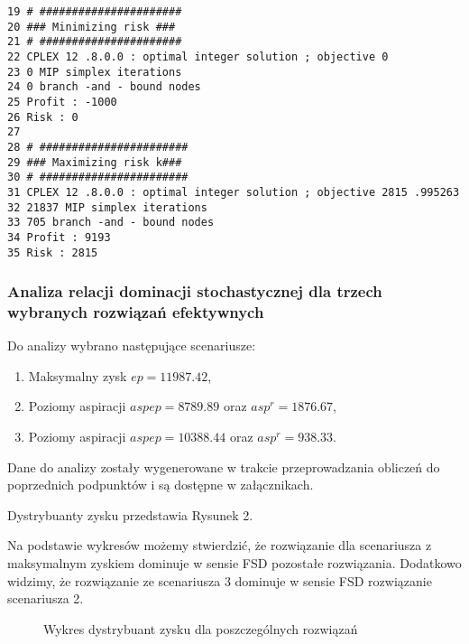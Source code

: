 \documentclass[12pt]{article}
\begin{document}
\begin{verbatim}
19 # ######################
20 ### Minimizing risk ###
21 # ######################
22 CPLEX 12 .8.0.0 : optimal integer solution ; objective 0
23 0 MIP simplex iterations
24 0 branch -and - bound nodes
25 Profit : -1000
26 Risk : 0
27
28 # #######################
29 ### Maximizing risk k###
30 # #######################
31 CPLEX 12 .8.0.0 : optimal integer solution ; objective 2815 .995263
32 21837 MIP simplex iterations
33 705 branch -and - bound nodes
34 Profit : 9193
35 Risk : 2815
\end{verbatim}

\subsubsection{Analiza relacji dominacji stochastycznej dla trzech wybranych rozwiązań efektywnych}

Do analizy wybrano następujące scenariusze:

\begin{enumerate}
\item Maksymalny zysk $ep = 11987.42$,
\item Poziomy aspiracji $aspep = 8789.89$ oraz $asp^r = 1876.67$,
\item Poziomy aspiracji $aspep = 10388.44$ oraz $asp^r = 938.33$.
\end{enumerate}

Dane do analizy zostały wygenerowane w trakcie przeprowadzania obliczeń do poprzednich podpunktów i są dostępne w załącznikach.

Dystrybuanty zysku przedstawia Rysunek 2.

Na podstawie wykresów możemy stwierdzić, że rozwiązanie dla scenariusza z maksymalnym zyskiem dominuje w sensie FSD pozostałe rozwiązania. Dodatkowo widzimy, że rozwiązanie ze scenariusza 3 dominuje w sensie FSD rozwiązanie scenariusza 2.

\begin{figure}[h!]
\centering
\caption{Wykres dystrybuant zysku dla poszczególnych rozwiązań}
\end{figure}
\end{document}
